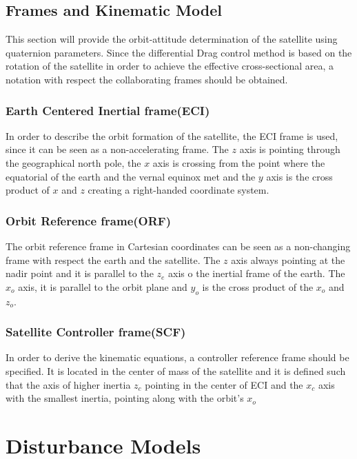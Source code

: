 \subsection{Frames and Kinematic Model}
%
This section will provide the orbit-attitude determination of the satellite using quaternion parameters. Since the differential Drag control method is based on the rotation of the satellite in order to achieve the effective cross-sectional area, a notation with respect the collaborating frames should be obtained.     
%
\subsubsection{Earth Centered Inertial frame(ECI)}
%
In order to describe the orbit formation of the satellite, the ECI frame is used, since it can be seen as a non-accelerating frame. The $z$ axis is pointing through the geographical north pole, the $x$ axis is crossing from the point where the equatorial of the earth and the vernal equinox met and the $y$ axis is the cross product of $x$ and $z$ creating a right-handed coordinate system. 
%
\subsubsection{Orbit Reference frame(ORF)}
%
The orbit reference frame in Cartesian coordinates can be seen as a non-changing frame with respect the earth and the satellite. The $z$ axis always pointing at the nadir point and it is parallel to the $z_{e}$ axis o the inertial frame of the earth. The $x_{o}$ axis, it is parallel to the orbit plane and $y_{o}$ is the cross product of the $x_{o}$ and $z_{o}$. 
%
\subsubsection{Satellite Controller frame(SCF)}
%
In order to derive the kinematic equations, a controller reference frame should be specified. It is located in the center of mass of the satellite and it is defined such that the axis of higher inertia $z_{c}$ pointing in the center of ECI and the $x_{c}$ axis with the smallest inertia, pointing along with  the orbit's $x_{o}$ 
%
\section{Disturbance Models}\label{sec:useCase} 
